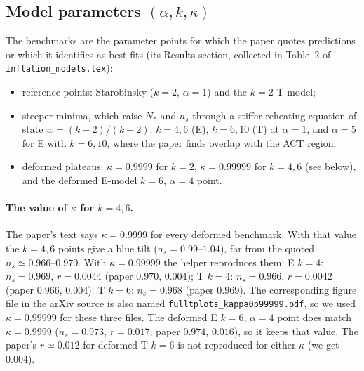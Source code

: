 \documentclass[11pt,a4paper]{article}
\newcommand{\aatt}{\alpha}
\newcommand{\file}[1]{\texttt{#1}}
\begin{document}
\subsection{Model parameters $(\aatt,k,\kappa)$}
The benchmarks are the parameter points for which the paper quotes predictions or which it identifies as best fits (its Results section, collected in Table~2 of \file{inflation\_models.tex}):
\begin{itemize}
\item reference points: Starobinsky ($k=2$, $\aatt=1$) and the $k=2$ T-model;
\item steeper minima, which raise $N_*$ and $n_s$ through a stiffer reheating equation of state $w=(k-2)/(k+2)$: $k=4,6$ (E), $k=6,10$ (T) at $\aatt=1$, and $\aatt=5$ for E with $k=6,10$, where the paper finds overlap with the ACT region;
\item deformed plateaus: $\kappa=0.9999$ for $k=2$, $\kappa=0.99999$ for $k=4,6$ (see below), and the deformed E-model $k=6$, $\aatt=4$ point.
\end{itemize}

\paragraph{The value of $\kappa$ for $k=4,6$.}
The paper's text says $\kappa=0.9999$ for every deformed benchmark. With that value the $k=4,6$ points give a blue tilt ($n_s=0.99$--$1.04$), far from the quoted $n_s\simeq0.966$--$0.970$. With $\kappa=0.99999$ the helper reproduces them: E $k=4$: $n_s=0.969$, $r=0.0044$ (paper $0.970$, $0.004$); T $k=4$: $n_s=0.966$, $r=0.0042$ (paper $0.966$, $0.004$); T $k=6$: $n_s=0.968$ (paper $0.969$). The corresponding figure file in the arXiv source is also named \file{fulltplots\_kappa0p99999.pdf}, so we used $\kappa=0.99999$ for these three files. The deformed E $k=6$, $\aatt=4$ point does match $\kappa=0.9999$ ($n_s=0.973$, $r=0.017$; paper $0.974$, $0.016$), so it keeps that value. The paper's $r\simeq0.012$ for deformed T $k=6$ is not reproduced for either $\kappa$ (we get $0.004$).
\end{document}
